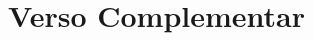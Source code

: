 \documentclass[12pt,aspectratio=169]{beamer}
\begin{document}
\section{Verso Complementar}

\end{document}
